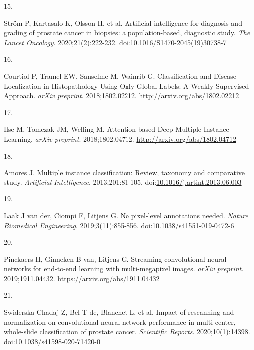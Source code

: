 \documentclass[
  12pt,
  a5,margin=2cmpaper,
]{article}
\newlength{\cslhangindent}
\newlength{\csllabelwidth}
\newlength{\cslentryspacingunit} %
\newenvironment{CSLReferences}[2] %
 {%
  \setlength{\parindent}{0pt}
  \ifodd #1
  \let\oldpar\par
  \def\par{\hangindent=\cslhangindent\oldpar}
  \fi
  \setlength{\parskip}{#2\cslentryspacingunit}
 }%
 {}
\newcommand{\CSLLeftMargin}[1]{\parbox[t]{\csllabelwidth}{#1}}
\newcommand{\CSLRightInline}[1]{\parbox[t]{\linewidth - \csllabelwidth}{#1}\break}
\begin{document}
\begin{CSLReferences}{0}{0}
\leavevmode{}%
\CSLLeftMargin{15. }%
\CSLRightInline{Ström P, Kartasalo K, Olsson H, et al. {Artificial
intelligence for diagnosis and grading of prostate cancer in biopsies: a
population-based, diagnostic study}. \emph{The Lancet Oncology}.
2020;21(2):222-232.
doi:\href{https://doi.org/10.1016/S1470-2045(19)30738-7}{10.1016/S1470-2045(19)30738-7}}

\leavevmode{}%
\CSLLeftMargin{16. }%
\CSLRightInline{Courtiol P, Tramel EW, Sanselme M, Wainrib G.
{Classification and Disease Localization in Histopathology Using Only
Global Labels: A Weakly-Supervised Approach}. \emph{arXiv preprint}.
2018;1802.02212. \url{http://arxiv.org/abs/1802.02212}}

\leavevmode{}%
\CSLLeftMargin{17. }%
\CSLRightInline{Ilse M, Tomczak JM, Welling M. {Attention-based Deep
Multiple Instance Learning}. \emph{arXiv preprint}. 2018;1802.04712.
\url{http://arxiv.org/abs/1802.04712}}

\leavevmode{}%
\CSLLeftMargin{18. }%
\CSLRightInline{Amores J. {Multiple instance classification: Review,
taxonomy and comparative study}. \emph{Artificial Intelligence}.
2013;201:81-105.
doi:\href{https://doi.org/10.1016/j.artint.2013.06.003}{10.1016/j.artint.2013.06.003}}

\leavevmode{}%
\CSLLeftMargin{19. }%
\CSLRightInline{Laak J van der, Ciompi F, Litjens G. {No pixel-level
annotations needed}. \emph{Nature Biomedical Engineering}.
2019;3(11):855-856.
doi:\href{https://doi.org/10.1038/s41551-019-0472-6}{10.1038/s41551-019-0472-6}}

\leavevmode{}%
\CSLLeftMargin{20. }%
\CSLRightInline{Pinckaers H, Ginneken B van, Litjens G. {Streaming
convolutional neural networks for end-to-end learning with
multi-megapixel images}. \emph{arXiv preprint}. 2019;1911.04432.
\url{https://arxiv.org/abs/1911.04432}}

\leavevmode{}%
\CSLLeftMargin{21. }%
\CSLRightInline{Swiderska-Chadaj Z, Bel T de, Blanchet L, et al. {Impact
of rescanning and normalization on convolutional neural network
performance in multi-center, whole-slide classification of prostate
cancer}. \emph{Scientific Reports}. 2020;10(1):14398.
doi:\href{https://doi.org/10.1038/s41598-020-71420-0}{10.1038/s41598-020-71420-0}}


\end{CSLReferences}
\end{document}
